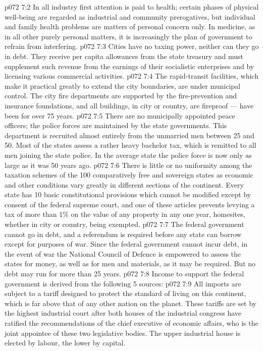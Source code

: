 \vs p072 7:2 In all industry first attention is paid to health; certain phases of physical well\hyp{}being are regarded as industrial and community prerogatives, but individual and family health problems are matters of personal concern only. In medicine, as in all other purely personal matters, it is increasingly the plan of government to refrain from interfering.
\vs p072 7:3 \pc Cities have no taxing power, neither can they go in debt. They receive per capita allowances from the state treasury and must supplement such revenue from the earnings of their socialistic enterprises and by licensing various commercial activities.
\vs p072 7:4 The rapid\hyp{}transit facilities, which make it practical greatly to extend the city boundaries, are under municipal control. The city fire departments are supported by the fire\hyp{}prevention and insurance foundations, and all buildings, in city or country, are fireproof --- have been for over 75 years.
\vs p072 7:5 There are no municipally appointed peace officers; the police forces are maintained by the state governments. This department is recruited almost entirely from the unmarried men between 25 and 50. Most of the states assess a rather heavy bachelor tax, which is remitted to all men joining the state police. In the average state the police force is now only  as large as it was 50 years ago.
\vs p072 7:6 \pc There is little or no uniformity among the taxation schemes of the 100 comparatively free and sovereign states as economic and other conditions vary greatly in different sections of the continent. Every state has 10 basic constitutional provisions which cannot be modified except by consent of the federal supreme court, and one of these articles prevents levying a tax of more than 1\% on the value of any property in any one year, homesites, whether in city or country, being exempted.
\vs p072 7:7 The federal government cannot go in debt, and a  referendum is required before any state can borrow except for purposes of war. Since the federal government cannot incur debt, in the event of war the National Council of Defence is empowered to assess the states for money, as well as for men and materials, as it may be required. But no debt may run for more than 25 years.
\vs p072 7:8 \pc Income to support the federal government is derived from the following 5 sources:
\vs p072 7:9 \bibnobreakspace {} All imports are subject to a tariff designed to protect the standard of living on this continent, which is far above that of any other nation on the planet. These tariffs are set by the highest industrial court after both houses of the industrial congress have ratified the recommendations of the chief executive of economic affairs, who is the joint appointee of these two legislative bodies. The upper industrial house is elected by labour, the lower by capital.

